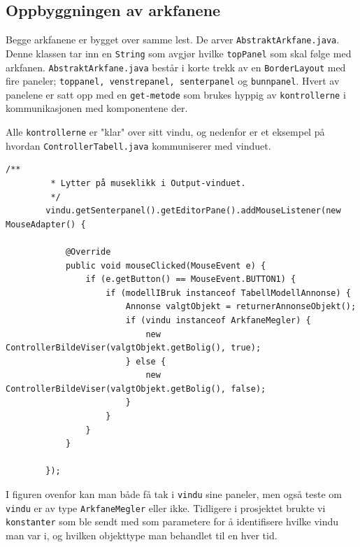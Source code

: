 \subsection{Oppbyggningen av arkfanene}
Begge arkfanene er bygget over samme lest. De arver \texttt{AbstraktArkfane.java}. Denne klassen tar inn en \texttt{String} som avgjør hvilke \texttt{topPanel} som skal følge med arkfanen.
\texttt{AbstraktArkfane.java} består i korte trekk av en \texttt{BorderLayout} med fire paneler; \texttt{toppanel, venstrepanel, senterpanel} og \texttt{bunnpanel}.
Hvert av panelene er satt opp med en \texttt{get-metode} som brukes hyppig av \texttt{kontrollerne} i kommunikasjonen med komponentene der.

Alle \texttt{kontrollerne} er "klar" over sitt vindu, og nedenfor er et eksempel på hvordan \texttt{ControllerTabell.java} kommuniserer med vinduet.

\begin{lstlisting}[caption=Kodeeksempel på hvordan \texttt{ControllerTabell.java} kommuniserer med brukergrensesnittet]
        /**
         * Lytter på museklikk i Output-vinduet.
         */
        vindu.getSenterpanel().getEditorPane().addMouseListener(new MouseAdapter() {

            @Override
            public void mouseClicked(MouseEvent e) {
                if (e.getButton() == MouseEvent.BUTTON1) {
                    if (modellIBruk instanceof TabellModellAnnonse) {
                        Annonse valgtObjekt = returnerAnnonseObjekt();
                        if (vindu instanceof ArkfaneMegler) {
                            new ControllerBildeViser(valgtObjekt.getBolig(), true);
                        } else {
                            new ControllerBildeViser(valgtObjekt.getBolig(), false);
                        }
                    }
                }
            }

        });
\end{lstlisting}

I figuren ovenfor kan man både få tak i \texttt{vindu} sine paneler, men også teste om \texttt{vindu} er av type \texttt{ArkfaneMegler} eller ikke. Tidligere i prosjektet brukte vi \texttt{konstanter} som ble sendt med som parametere for å identifisere hvilke vindu man var i, og hvilken objekttype man behandlet til en hver tid.


